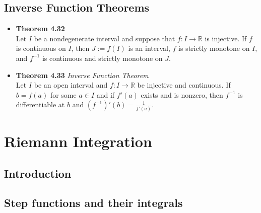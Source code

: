 \documentclass[11pt,a4paper]{article}
\begin{document}
\subsection{Inverse Function Theorems}

\begin{itemize}

    \item \textbf{Theorem 4.32} \\
        Let $I$ be a nondegenerate interval and suppose that $f : I \to \mathbb{R}$ is
        injective.
        If $f$ is continuous on $I$, then $J := f(I)$ is an interval, $f$ is strictly
        monotone on $I$, and $f^{-1}$ is continuous and strictly monotone on $J$.

    \item \textbf{Theorem 4.33} \emph{Inverse Function Theorem} \\
        Let $I$ be an open interval and $f : I \to \mathbb{R}$ be injective and continuous.
        If $b = f(a)$ for some $a \in I$ and if $f'(a)$ exists and is nonzero,
        then $f^{-1}$ is differentiable at $b$ and $(f^{-1})'(b) = \frac{1}{f'(a)}$.
\end{itemize}

\break{}

\section{Riemann Integration}

\subsection{Introduction}

\subsection{Step functions and their integrals}
\end{document}
